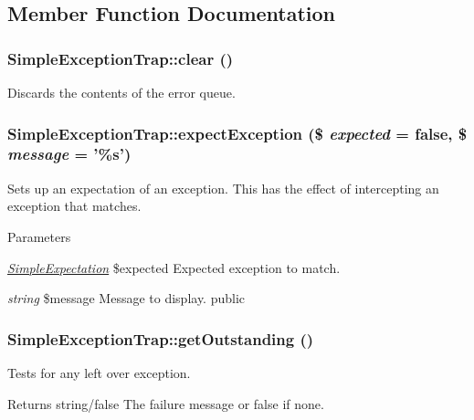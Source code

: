 \subsection{Member Function Documentation}
\hypertarget{class_simple_exception_trap_a7ac356c223556212bca03226f9d0f815}{
\subsubsection[{clear}]{\setlength{\rightskip}{0pt plus 5cm}SimpleExceptionTrap::clear ()}}
\label{class_simple_exception_trap_a7ac356c223556212bca03226f9d0f815}
Discards the contents of the error queue. \hypertarget{class_simple_exception_trap_a968818290e76aef73c68bf109f6edaca}{
\subsubsection[{expectException}]{\setlength{\rightskip}{0pt plus 5cm}SimpleExceptionTrap::expectException (\$ {\em expected} = {\ttfamily false}, \/  \$ {\em message} = {\ttfamily '\%s'})}}
\label{class_simple_exception_trap_a968818290e76aef73c68bf109f6edaca}
Sets up an expectation of an exception. This has the effect of intercepting an exception that matches. 
\begin{DoxyParams}{Parameters}
\item[{\em \hyperlink{class_simple_expectation}{SimpleExpectation}}]\$expected Expected exception to match. \item[{\em string}]\$message Message to display.  public \end{DoxyParams}
\hypertarget{class_simple_exception_trap_a2d537afc3ff693620bcacc575e22aea7}{
\subsubsection[{getOutstanding}]{\setlength{\rightskip}{0pt plus 5cm}SimpleExceptionTrap::getOutstanding ()}}
\label{class_simple_exception_trap_a2d537afc3ff693620bcacc575e22aea7}
Tests for any left over exception. \begin{DoxyReturn}{Returns}
string/false The failure message or false if none. 
\end{DoxyReturn}
